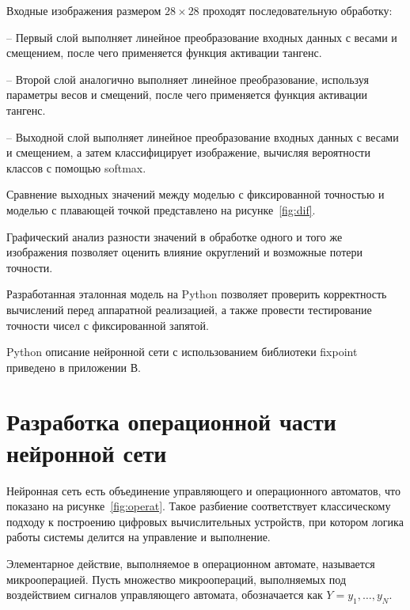 Входные изображения размером \(28 \times 28\) проходят последовательную 
обработку:

  – Первый слой выполняет линейное преобразование входных данных с весами и 
смещением, после чего применяется функция активации тангенс.
    
  – Второй слой аналогично выполняет линейное преобразование, используя 
параметры весов и смещений, после чего применяется функция активации тангенс.
    
  – Выходной слой выполняет линейное преобразование входных данных с весами и 
смещением, а затем классифицирует изображение, вычисляя вероятности классов с 
помощью softmax.

Сравнение выходных значений между моделью с фиксированной точностью и моделью с
плавающей точкой представлено на рисунке~\ref{fig:dif}.  


Графический анализ разности значений в обработке одного и того же изображения 
позволяет оценить влияние округлений и возможные потери точности.

Разработанная эталонная модель на Python позволяет проверить корректность 
вычислений перед аппаратной реализацией, а также провести тестирование 
точности чисел с фиксированной запятой.

Python описание нейронной сети с использованием библиотеки fixpoint приведено в
приложении В.

\section{Разработка операционной части нейронной сети}
\hspace*{12.5 mm}Нейронная сеть есть объединение управляющего и операционного
автоматов, что показано на рисунке~\ref{fig:operat}. Такое разбиение 
соответствует классическому подходу к построению цифровых вычислительных 
устройств, при котором логика работы системы делится на управление и выполнение.


Элементарное действие, выполняемое в операционном автомате, называется 
микрооперацией. Пусть множество микроопераций, выполняемых под воздействием 
сигналов управляющего автомата, обозначается как \( Y = y_1, \dots, y_N\).  

